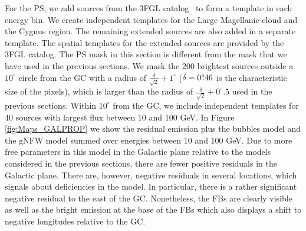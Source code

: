 For the PS, we add sources from the 3FGL catalog~\citep{2015ApJS..218...23A} to form a template
in each energy bin.
We create independent templates for the Large Magellanic cloud and the Cygnus region.
The remaining extended sources are also added in a separate template.
The spatial templates for the extended sources are provided by the 3FGL catalog.
The PS mask in this section is different from the mask that we have used in the previous sections.
We mask the 200 brightest sources outside a $10^\circ$ circle from the GC 
with a radius of $\frac{\delta}{\sqrt{2}} + 1^\circ$ ($\delta = 0^\circ\!\!.46$ is the characteristic size of the pixels),
which is larger than the radius of  $\frac{\delta}{\sqrt{2}} + 0^\circ\!\!.5$ used in the previous sections.
Within $10^\circ$ from the GC, we include independent templates for 40 sources with largest flux between 10 and 100 GeV.
In Figure \ref{fig:Maps_GALPROP} we show the residual emission plus the \Fermi bubbles model and the gNFW model summed over energies between 10 and 100 GeV.
Due to more free parameters in this model in the Galactic plane relative to the models considered in the previous sections,
there are fewer positive residuals in the Galactic plane.
There are, however, negative residuals in several locations, which signals about deficiencies in the model. 
In particular, there is a rather significant negative residual to the east of the GC.
Nonetheless, the FBs are clearly visible as well as the bright emission at the base of the FBs which also displays a shift to negative
longitudes relative to the GC.


